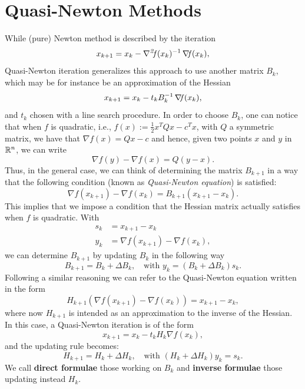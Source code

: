 \documentclass[10pt,a4paper]{article}
\begin{document}
\section{Quasi-Newton Methods}
While (pure) Newton method is described by the iteration
\begin{equation*}
	x_{k+1} = x_k - \operatorname*{\mathit{\nabla^2 \!f}}(x_k)^{-1} \operatorname*{\mathit{\nabla \!f}}(x_k),
\end{equation*}
Quasi-Newton iteration generalizes this approach to use another matrix $B_k$, which may be for instance be an approximation of the Hessian
\begin{equation*}
	x_{k+1} = x_k - t_kB_k^{-1} \operatorname*{\mathit{\nabla \!f}}(x_k),
\end{equation*}
and $t_k$ chosen with a line search procedure. In order to choose $B_k$, one can notice that when $f$ is quadratic, i.e., $f(x):= \frac{1}{2}x^TQx -c^Tx$, with $Q$ a symmetric matrix, we have that $\nabla f(x) = Qx - c$ and hence, given two points $x$ and $y$ in $\mathbb{R}^n$, we can write
\begin{equation*}
	\nabla f(y) - \nabla f(x) = Q(y - x).
\end{equation*}
Thus, in the general case, we can think of determining the matrix $B_{k+1}$ in a way that the following condition (known as \textit{Quasi-Newton equation}) is satisfied:
\begin{equation}\label{eq:quasi-newton}
\nabla f(x_{k+1}) - \nabla f(x_k) = B_{k+1}(x_{k+1} - x_k).
\end{equation}
This implies that we impose a condition that the Hessian matrix actually satisfies when $f$ is quadratic. With
\begin{align*}
 	s_k &= x_{k+1} - x_k \\
 	y_k &= \nabla f(x_{k+1}) - \nabla f(x_k),
\end{align*}
we can determine $B_{k+1}$ by updating $B_k$ in the following way
\begin{equation*}
	B_{k+1} = B_k + \Delta B_k, \quad \text{with } y_k = (B_k + \Delta B_k) s_k.
\end{equation*}
Following a similar reasoning we can refer to the Quasi-Newton equation written in the form
\begin{equation*}
	H_{k+1}(\nabla f(x_{k+1}) - \nabla f(x_k)) = x_{k+1} - x_k,
\end{equation*}
where now $H_{k+1}$ is intended as an approximation to the inverse of the Hessian. In this case, a Quasi-Newton iteration is of the form
\begin{equation*}
	x_{k+1} = x_k - t_k H_k \nabla f(x_k),
\end{equation*}
and the updating rule becomes:
\begin{equation*}
	H_{k+1} = H_k + \Delta H_k, \quad \text{with } (H_k + \Delta H_k) y_k = s_k.
\end{equation*}
We call \textbf{direct formulae} those working on $B_k$ and \textbf{inverse formulae} those updating instead $H_k$.
\end{document}
